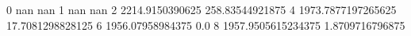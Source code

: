 0 nan nan
1 nan nan
2 2214.9150390625 258.83544921875
4 1973.7877197265625 17.7081298828125
6 1956.07958984375 0.0
8 1957.9505615234375 1.8709716796875
